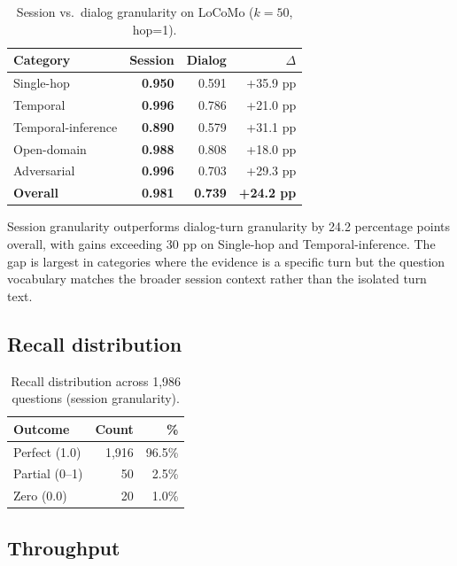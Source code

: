 \documentclass[11pt,a4paper]{article}
\begin{document}
\begin{table}[H]
\centering
\caption{Session vs.\ dialog granularity on LoCoMo ($k{=}50$, hop=1).}
\label{tab:granularity}
\begin{tabular}{lrrr}
  \toprule
  \textbf{Category} & \textbf{Session} & \textbf{Dialog} & \textbf{$\Delta$} \\
  \midrule
  Single-hop          & \textbf{0.950} & 0.591 & +35.9 pp \\
  Temporal            & \textbf{0.996} & 0.786 & +21.0 pp \\
  Temporal-inference  & \textbf{0.890} & 0.579 & +31.1 pp \\
  Open-domain         & \textbf{0.988} & 0.808 & +18.0 pp \\
  Adversarial         & \textbf{0.996} & 0.703 & +29.3 pp \\
  \midrule
  \textbf{Overall}    & \textbf{0.981} & \textbf{0.739} & \textbf{+24.2 pp} \\
  \bottomrule
\end{tabular}
\end{table}

Session granularity outperforms dialog-turn granularity by 24.2 percentage
points overall, with gains exceeding 30 pp on Single-hop and
Temporal-inference.
The gap is largest in categories where the evidence is a specific turn but the
question vocabulary matches the broader session context rather than the
isolated turn text.

\subsection{Recall distribution}

\begin{table}[H]
\centering
\caption{Recall distribution across 1,986 questions (session granularity).}
\label{tab:distribution}
\begin{tabular}{lrr}
  \toprule
  \textbf{Outcome} & \textbf{Count} & \textbf{\%} \\
  \midrule
  Perfect (1.0) & 1,916 & 96.5\% \\
  Partial (0--1) &    50 &  2.5\% \\
  Zero (0.0)     &    20 &  1.0\% \\
  \bottomrule
\end{tabular}
\end{table}

\subsection{Throughput}
\end{document}
